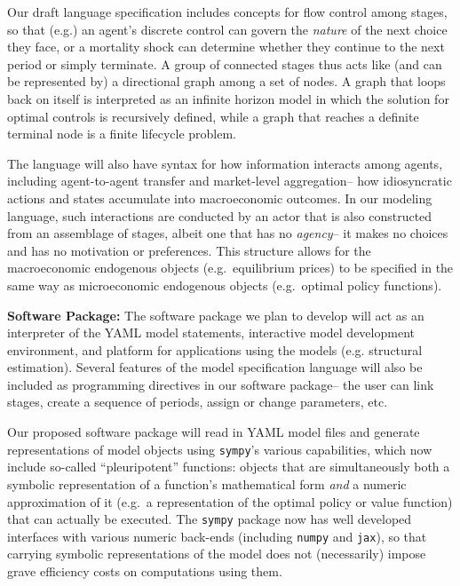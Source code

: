 \documentclass[12pt,pdftex,letterpaper]{article}
\begin{document}
Our draft language specification includes concepts for flow control among stages, so that (e.g.) an agent's discrete control can govern the \textit{nature} of the next choice they face, or a mortality shock can determine whether they continue to the next period or simply terminate. A group of connected stages thus acts like (and can be represented by) a directional graph among a set of nodes. A graph that loops back on itself is interpreted as an infinite horizon model in which the solution for optimal controls is recursively defined, while a graph that reaches a definite terminal node is a finite lifecycle problem.

The language will also have syntax for how information interacts among agents, including agent-to-agent transfer and market-level aggregation-- how idiosyncratic actions and states accumulate into macroeconomic outcomes. In our modeling language, such interactions are conducted by an actor that is also constructed from an assemblage of stages, albeit one that has no \textit{agency}-- it makes no choices and has no motivation or preferences. This structure allows for the macroeconomic endogenous objects (e.g.\ equilibrium prices) to be specified in the same way as microeconomic endogenous objects (e.g.\ optimal policy functions).

\vspace{0.5cm}

\noindent \textbf{Software Package:} The software package we plan to develop will act as an interpreter of the YAML model statements, interactive model development environment, and platform for applications using the models (e.g. structural estimation). Several features of the model specification language will also be included as programming directives in our software package-- the user can link stages, create a sequence of periods, assign or change parameters, etc.

Our proposed software package will read in YAML model files and generate representations of model objects using \texttt{sympy}'s various capabilities, which now include so-called ``pleuripotent'' functions: objects that are simultaneously both a symbolic representation of a function's mathematical form \textit{and} a numeric approximation of it (e.g.\ a representation of the optimal policy or value function) that can actually be executed. The \texttt{sympy} package now has well developed interfaces with various numeric back-ends (including \texttt{numpy} and \texttt{jax}), so that carrying symbolic representations of the model does not (necessarily) impose grave efficiency costs on computations using them.
\end{document}
